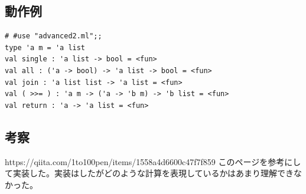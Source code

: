 \documentclass[11pt,a4paper]{jsarticle}
\begin{document}
\subsection*{動作例}
\begin{lstlisting}[basicstyle=\ttfamily\footnotesize, frame=single]
# #use "advanced2.ml";;
type 'a m = 'a list
val single : 'a list -> bool = <fun>
val all : ('a -> bool) -> 'a list -> bool = <fun>
val join : 'a list list -> 'a list = <fun>
val ( >>= ) : 'a m -> ('a -> 'b m) -> 'b list = <fun>
val return : 'a -> 'a list = <fun>
\end{lstlisting}
\subsection*{考察}
https://qiita.com/1to100pen/items/1558a4d6600c47f7f859
このページを参考にして実装した。実装はしたがどのような計算を表現しているかはあまり理解できなかった。
\end{document}
